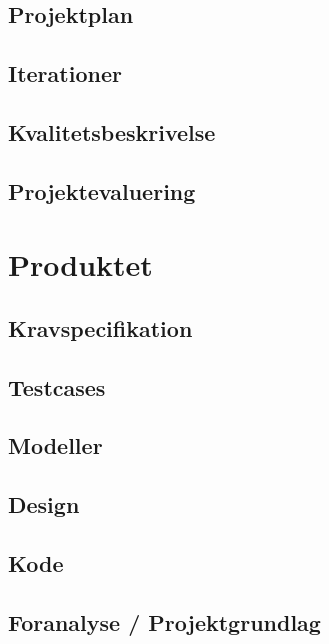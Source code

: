 \documentclass[12pt, a4paper]{report}
\begin{document}
\section*{Projektplan}

\section*{Iterationer}

\section*{Kvalitetsbeskrivelse}

\section*{Projektevaluering}

\chapter*{Produktet}

\section*{Kravspecifikation}

\section*{Testcases}

\section*{Modeller}

\section*{Design}

\section*{Kode}

\section*{Foranalyse / Projektgrundlag}
\end{document}
